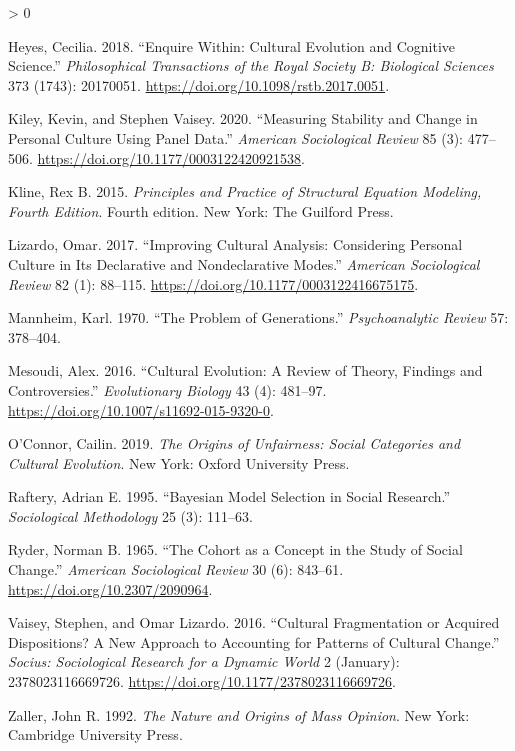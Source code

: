 \documentclass[
  11pt,
]{article}
\newlength{\cslhangindent}
\newenvironment{CSLReferences}[2] %
 {%
  \setlength{\parindent}{0pt}
  \ifodd #1 \everypar{\setlength{\hangindent}{\cslhangindent}}\ignorespaces\fi
  \ifnum #2 > 0
  \setlength{\parskip}{#2\baselineskip}
  \fi
 }%
 {}
\begin{document}
\begin{CSLReferences}{1}{0}
\leavevmode\hypertarget{ref-heyes2018}{}%
Heyes, Cecilia. 2018. {``Enquire Within: Cultural Evolution and Cognitive Science.''} \emph{Philosophical Transactions of the Royal Society B: Biological Sciences} 373 (1743): 20170051. \url{https://doi.org/10.1098/rstb.2017.0051}.

\leavevmode\hypertarget{ref-kiley2020}{}%
Kiley, Kevin, and Stephen Vaisey. 2020. {``Measuring {Stability} and {Change} in {Personal Culture Using Panel Data}.''} \emph{American Sociological Review} 85 (3): 477--506. \url{https://doi.org/10.1177/0003122420921538}.

\leavevmode\hypertarget{ref-kline2015}{}%
Kline, Rex B. 2015. \emph{Principles and {Practice} of {Structural Equation Modeling}, {Fourth Edition}}. Fourth edition. {New York}: {The Guilford Press}.

\leavevmode\hypertarget{ref-lizardo2017}{}%
Lizardo, Omar. 2017. {``Improving {Cultural Analysis}: {Considering Personal Culture} in Its {Declarative} and {Nondeclarative Modes}.''} \emph{American Sociological Review} 82 (1): 88--115. \url{https://doi.org/10.1177/0003122416675175}.

\leavevmode\hypertarget{ref-mannheim1970}{}%
Mannheim, Karl. 1970. {``The {Problem} of {Generations}.''} \emph{Psychoanalytic Review} 57: 378--404.

\leavevmode\hypertarget{ref-mesoudi2016}{}%
Mesoudi, Alex. 2016. {``Cultural {Evolution}: {A Review} of {Theory}, {Findings} and {Controversies}.''} \emph{Evolutionary Biology} 43 (4): 481--97. \url{https://doi.org/10.1007/s11692-015-9320-0}.

\leavevmode\hypertarget{ref-oconnor2019}{}%
O'Connor, Cailin. 2019. \emph{The {Origins} of {Unfairness}: {Social Categories} and {Cultural Evolution}}. {New York}: {Oxford University Press}.

\leavevmode\hypertarget{ref-raftery1995}{}%
Raftery, Adrian E. 1995. {``Bayesian {Model Selection} in {Social Research}.''} \emph{Sociological Methodology} 25 (3): 111--63.

\leavevmode\hypertarget{ref-ryder1965}{}%
Ryder, Norman B. 1965. {``The {Cohort} as a {Concept} in the {Study} of {Social Change}.''} \emph{American Sociological Review} 30 (6): 843--61. \url{https://doi.org/10.2307/2090964}.

\leavevmode\hypertarget{ref-vaisey2016}{}%
Vaisey, Stephen, and Omar Lizardo. 2016. {``Cultural {Fragmentation} or {Acquired Dispositions}? {A New Approach} to {Accounting} for {Patterns} of {Cultural Change}.''} \emph{Socius: Sociological Research for a Dynamic World} 2 (January): 2378023116669726. \url{https://doi.org/10.1177/2378023116669726}.

\leavevmode\hypertarget{ref-zaller1992}{}%
Zaller, John R. 1992. \emph{The {Nature} and {Origins} of {Mass Opinion}}. {New York}: {Cambridge University Press}.

\end{CSLReferences}
\end{document}
